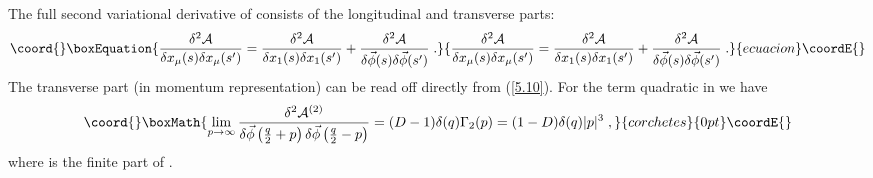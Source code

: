 \documentclass[a4paper,12pt]{article}
\numberwithin{equation}{section}
\begin{document}
The full second variational derivative of \coordHE{} consists of the
longitudinal and transverse parts:
\begin{equation}\coord{}\boxEquation{
\label{7.1}
\frac{\delta ^{2}\mathcal{A}}{\delta x_{\mu }(s)\delta x_{\mu }(s')}=\frac{\delta ^{2}\mathcal{A}}{\delta x_{1}(s)\delta x_{1}(s')}+\frac{\delta ^{2}\mathcal{A}}{\delta \vec{\phi }(s)\delta \vec{\phi }(s')}\; .
}{
\frac{\delta ^{2}\mathcal{A}}{\delta x_{\mu }(s)\delta x_{\mu }(s')}=\frac{\delta ^{2}\mathcal{A}}{\delta x_{1}(s)\delta x_{1}(s')}+\frac{\delta ^{2}\mathcal{A}}{\delta \vec{\phi }(s)\delta \vec{\phi }(s')}\; .
}{ecuacion}\coordE{}\end{equation}
The transverse part (in momentum representation) can be read off directly from
(\ref{5.10}). For the term quadratic in \myHighlight{\( \phi  \)}\coordHE{} we have 
\[\coord{}\boxMath{
\lim _{p\to \infty }\frac{\delta ^{2}\mathcal{A}^{(2)}}{\delta \vec{\phi }\left( \frac{q}{2}+p\right) \delta \vec{\phi }\left( \frac{q}{2}-p\right) }=(D-1)\delta (q)\Gamma _{2}(p)=(1-D)\delta (q)|p|^{3}\; ,}{corchetes}{0pt}\coordE{}\]
where \coordHE{} is the finite part of \coordHE{}. 
\end{document}
